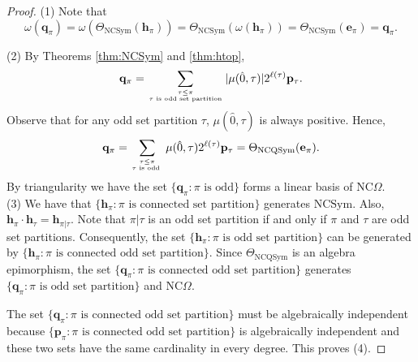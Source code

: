 \documentclass[11pt]{amsart}
\numberwithin{equation}{section}
\newcommand{\NCQSym}{\mathrm{NCQSym}}
\newcommand{\NCSym}{\mathrm{NCSym}}
\newcommand{\NCGamma}{\mathrm{NC}\Omega}
\newcommand{\bfh}{{\mathbf{h}}}
\newcommand{\bfe}{{\mathbf{e}}}
\begin{document}
\begin{proof} 
(1) Note that $$\omega(\mathbf{q}_\pi) =\omega(\Theta_{\NCSym}(\bfh_\pi)) =\Theta_{\NCSym}(\omega(\bfh_\pi))=\Theta_{\NCSym}(\bfe_\pi)=\mathbf{q}_\pi.$$

(2) 
By Theorems \ref{thm:NCSym} and \ref{thm:htop},
$$\mathbf{q}_\pi=\sum_{\tau\leq\pi \atop \tau\text{ is odd set partition}}|\mu(\hat{0},\tau)|2^{\ell(\tau)}\mathbf{p}_{\tau}.$$
Observe that for any odd set partition $\tau$, $\mu(\hat{0},\tau)$ is always positive. Hence,
$$\mathbf{q}_\pi=\sum_{\tau\leq\pi \atop \tau\text{ is odd }}\mu(\hat{0},\tau)2^{\ell(\tau)}\mathbf{p}_{\tau}=\Theta_{\NCQSym}(\mathbf{e}_\pi).$$
	 By triangularity we have  the set $\{\mathbf{q}_\pi:\pi\text{ is odd}\}$ forms a linear basis of $\NCGamma$.
	\\
	
(3)	We have that $\{\mathbf{h}_\pi:\pi\text{ is connected set partition}\}$ generates $\NCSym$. Also, $\mathbf{h}_\pi\cdot \mathbf{h}_{\tau}=\mathbf{h}_{\pi|\tau}$. Note that $\pi|\tau$ is an odd set partition if and only if $\pi$ and $\tau$ are odd set partitions. Consequently, the set $\{\mathbf{h}_\pi:\pi\text{ is odd set partition}\}$ can be generated by $\{\mathbf{h}_\pi:\pi\text{ is connected odd set partition}\}$. Since $\Theta_{\NCQSym}$ is an algebra epimorphism, the set $\{\mathbf{q}_\pi:\pi\text{ is connected odd set partition}\}$ generates $\{\mathbf{q}_\pi:\pi\text{ is odd set partition}\}$ and $\NCGamma$.
	
	The set $\{\mathbf{q}_\pi:\pi\text{ is connected odd set partition}\}$ must be algebraically independent because $\{\mathbf{p}_\pi:\pi\text{ is connected odd set partition}\}$ is algebraically independent and these two sets have the same cardinality in every degree. This proves (4).
\end{proof}
\end{document}
